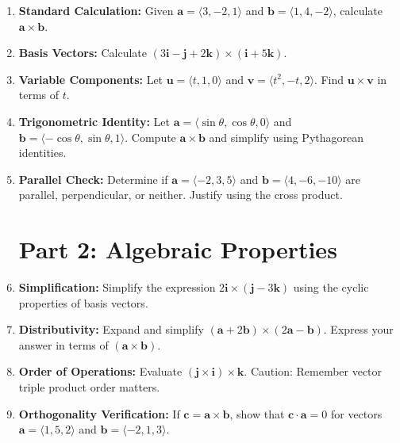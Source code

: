 \documentclass[11pt]{article}
\begin{document}
\begin{enumerate}
    \item \textbf{Standard Calculation:} Given $\mathbf{a} = \langle 3, -2, 1 \rangle$ and $\mathbf{b} = \langle 1, 4, -2 \rangle$, calculate $\mathbf{a} \times \mathbf{b}$.
    
    \item \textbf{Basis Vectors:} Calculate $(3\mathbf{i} - \mathbf{j} + 2\mathbf{k}) \times (\mathbf{i} + 5\mathbf{k})$.
    
    \item \textbf{Variable Components:} Let $\mathbf{u} = \langle t, 1, 0 \rangle$ and $\mathbf{v} = \langle t^2, -t, 2 \rangle$. Find $\mathbf{u} \times \mathbf{v}$ in terms of $t$.
    
    \item \textbf{Trigonometric Identity:} Let $\mathbf{a} = \langle \sin\theta, \cos\theta, 0 \rangle$ and $\mathbf{b} = \langle -\cos\theta, \sin\theta, 1 \rangle$. Compute $\mathbf{a} \times \mathbf{b}$ and simplify using Pythagorean identities.
    
    \item \textbf{Parallel Check:} Determine if $\mathbf{a} = \langle -2, 3, 5 \rangle$ and $\mathbf{b} = \langle 4, -6, -10 \rangle$ are parallel, perpendicular, or neither. Justify using the cross product.

\section*{Part 2: Algebraic Properties}
    
    \item \textbf{Simplification:} Simplify the expression $2\mathbf{i} \times (\mathbf{j} - 3\mathbf{k})$ using the cyclic properties of basis vectors.
    
    \item \textbf{Distributivity:} Expand and simplify $(\mathbf{a} + 2\mathbf{b}) \times (2\mathbf{a} - \mathbf{b})$. Express your answer in terms of $(\mathbf{a} \times \mathbf{b})$.
    
    \item \textbf{Order of Operations:} Evaluate $(\mathbf{j} \times \mathbf{i}) \times \mathbf{k}$. Caution: Remember vector triple product order matters.
    
    \item \textbf{Orthogonality Verification:} If $\mathbf{c} = \mathbf{a} \times \mathbf{b}$, show that $\mathbf{c} \cdot \mathbf{a} = 0$ for vectors $\mathbf{a} = \langle 1, 5, 2 \rangle$ and $\mathbf{b} = \langle -2, 1, 3 \rangle$.
    

\end{enumerate}
\end{document}
